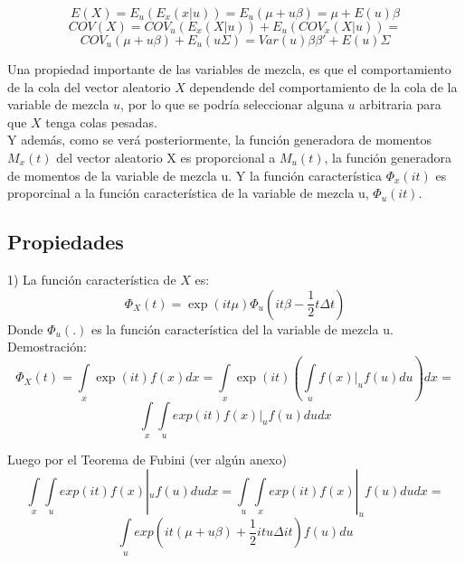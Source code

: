 \documentclass[11pt]{book}
\begin{document}
\begin{equation*}
E(X)=E_{u}(E_{x}(x|u))=E_{u}(\mu + u\beta)=\mu+E(u)\beta
\end{equation*}
\begin{equation*}
COV(X)=COV_{u}(E_{x}(X|u)) + E_{u}(COV_{x}(X|u))=
\end{equation*}
\begin{equation*}
COV_{u}(\mu + u\beta) + E_{u}(u\Sigma)=Var(u)\beta \beta' + E(u)\Sigma
\end{equation*}

Una propiedad importante de las variables de mezcla, es que el comportamiento de la cola del vector aleatorio $X$ dependende del comportamiento de la cola de la variable de mezcla $u$, por lo que se podría seleccionar alguna $u$ arbitraria para que $X$ tenga colas pesadas.\\

Y además, como se verá posteriormente, la función generadora de momentos $M_{x}(t)$ del vector aleatorio X es proporcional a $M_{u}(t)$, la función generadora de momentos de la variable de mezcla u. Y la función característica $\Phi_{x}(it)$ es proporcinal a la función característica de la variable de mezcla u, $\Phi_{u}(it)$.\\





\pagebreak
\subsection*{Propiedades}

1) La función característica de $X$ es: 
\begin{equation*}
\Phi_{X}(t)=\exp(it\mu\acute{})\Phi_{u}(it\beta\acute{}-\frac{1}{2}t\Delta t\acute{}) 
\end{equation*}
Donde $\Phi_{u}(.)$ es la función característica del la variable de mezcla u. \\

Demostración:\\
\begin{equation*}
\Phi_{X}(t)=\underset{x}{\int }\exp(it)f(x)dx = \underset{x}{\int }\exp(it)(\underset{u}{\int}f(x)|_{u}f(u)du)dx=
\end{equation*}
\begin{equation*}
\underset{x}{\int}\underset{u}{\int}exp(it)f(x)|_{u}f(u)dudx
\end{equation*}


Luego por el Teorema de Fubini (ver algún anexo)\\
\begin{equation*}
\underset{x}{\int}\underset{u}{\int}exp(it)f(x)|_{u}f(u)dudx=\underset{u}{\int}\underset{x}{\int}exp(it)f(x)|_{u}f(u)dudx=
\end{equation*}
 \begin{equation*}
 \underset{u}{\int}exp(it(\mu+ u\beta)+\frac{1}{2}itu\Delta it)f(u)du
 \end{equation*}
  
\end{document}
